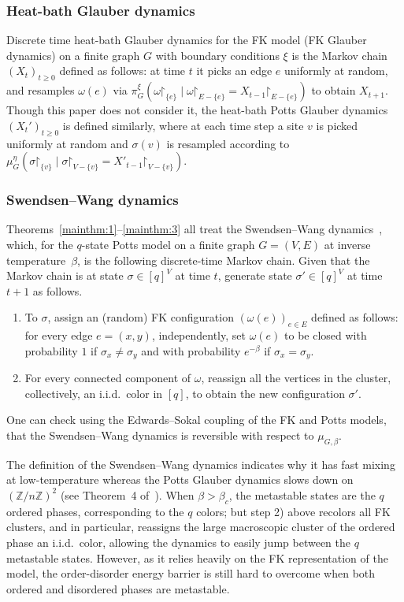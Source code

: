 \documentclass[reqno,11pt]{amsart}
\numberwithin{equation}{section}
\renewcommand{\restriction}{\mathord{\upharpoonright}}
\theoremstyle{definition}{
\newtheorem{example}[theorem]{Example}
\newtheorem{definition}[theorem]{Definition}
\newtheorem*{definition*}{Definition}
\newtheorem{problem}[theorem]{Problem}
\newtheorem{question}[theorem]{Question}
\newtheorem{remark}[theorem]{Remark}
}
\begin{document}
\subsubsection*{Heat-bath Glauber dynamics}
Discrete time heat-bath Glauber dynamics for the FK model (FK Glauber dynamics) on a finite graph $G$ with boundary conditions $\xi$ is the Markov chain $(X_t)_{t\geq 0}$ defined as follows: at time $t$ it picks an edge $e$ uniformly at random, and resamples $\omega(e)$ via  $\pi_G^\xi(\omega\restriction_{\{e\}}\mid \omega\restriction_{E-\{e\}}=X_{t-1}\restriction_{E-\{e\}})$ to obtain $X_{t+1}$.  Though this paper does not consider it, the heat-bath Potts Glauber dynamics $(X_t')_{t\geq 0}$ is defined similarly, where at each time step a site $v$ is picked uniformly at random and $\sigma(v)$ is resampled according to $\mu_G^{\eta}(\sigma \restriction_{\{v\}} \mid \sigma \restriction_{V-\{v\}} = X'_{t-1} \restriction_{V-\{v\}})$. 

\subsubsection*{Swendsen--Wang dynamics}
Theorems~\ref{mainthm:1}--\ref{mainthm:3} all treat the Swendsen--Wang dynamics~\cite{SW87}, which, for the $q$-state Potts model on a finite graph $G=(V,E)$ at inverse temperature~$\beta$, is the following discrete-time Markov chain. Given that the Markov chain is at state  $\sigma\in [q]^V$ at time $t$, generate state $\sigma'\in [q]^V$ at time $t+1$ as follows.
\begin{enumerate}
\item To $\sigma$, assign an (random) FK configuration $(\omega(e))_{e\in E}$ defined as follows: for every edge $e=(x,y)$, independently, set $\omega(e)$ to be closed with probability $1$ if $\sigma_x\neq \sigma_y$ and with probability $e^{-\beta}$ if $\sigma_x = \sigma_y$.
\item For every connected component of $\omega$,
reassign all the vertices in the cluster, collectively, an i.i.d.\ color in $[q]$, to obtain the new configuration $\sigma'$.
\end{enumerate}
One can check using the Edwards--Sokal coupling of the FK and Potts models, that the Swendsen--Wang dynamics is reversible with respect to $\mu_{G,\beta}$. 


\begin{remark}
The definition of the Swendsen--Wang dynamics indicates why it has fast mixing at low-temperature whereas the Potts Glauber dynamics slows down on $(\mathbb Z/n\mathbb Z)^2$ (see Theorem~4 of~\cite{GL16a}). When $\beta>\beta_c$, the metastable states are the $q$ ordered phases, corresponding to the $q$ colors; but step 2) above recolors all FK clusters, and in particular, reassigns the large macroscopic cluster of the ordered phase an i.i.d.\ color, allowing the dynamics to easily jump between the $q$ metastable states. However, as it relies heavily on the FK representation of the model, the order-disorder energy barrier is still hard to overcome when both ordered and disordered phases are metastable.     
\end{remark}
\end{document}
